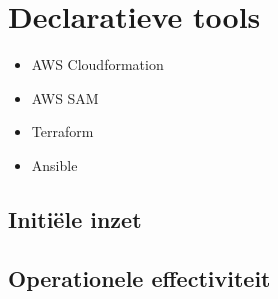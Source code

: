 \begin{table}[h!]
    \centering
    \caption{Tools gebaseerd op programmeertalen - Flexibiliteit}
\end{table}


\section{Declaratieve tools}
\label{sec:declaratieve-tools}

\begin{itemize}
    \item AWS Cloudformation
    \item AWS SAM
    \item Terraform
    \item Ansible
\end{itemize}

\subsection{Initiële inzet}
\label{subsec:initiële-inzet-decl}

\subsection{Operationele effectiviteit}
\label{subsec:operationele-eff-decl}

